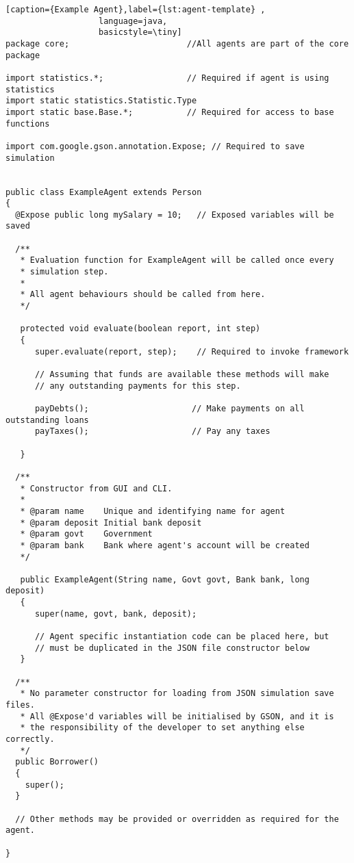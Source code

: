 \begin{lstlisting}[caption={Example Agent},label={lst:agent-template} ,
                   language=java,
                   basicstyle=\tiny]
package core;                        //All agents are part of the core package

import statistics.*;                 // Required if agent is using statistics
import static statistics.Statistic.Type
import static base.Base.*;           // Required for access to base functions

import com.google.gson.annotation.Expose; // Required to save simulation


public class ExampleAgent extends Person
{
  @Expose public long mySalary = 10;   // Exposed variables will be saved

  /**
   * Evaluation function for ExampleAgent will be called once every
   * simulation step. 
   *
   * All agent behaviours should be called from here.
   */

   protected void evaluate(boolean report, int step)
   {
      super.evaluate(report, step);    // Required to invoke framework

      // Assuming that funds are available these methods will make
      // any outstanding payments for this step.

      payDebts();                     // Make payments on all outstanding loans
      payTaxes();                     // Pay any taxes

   }

  /**
   * Constructor from GUI and CLI.
   *
   * @param name    Unique and identifying name for agent
   * @param deposit Initial bank deposit
   * @param govt    Government
   * @param bank    Bank where agent's account will be created
   */

   public ExampleAgent(String name, Govt govt, Bank bank, long deposit)
   {
      super(name, govt, bank, deposit);

      // Agent specific instantiation code can be placed here, but
      // must be duplicated in the JSON file constructor below
   }

  /**
   * No parameter constructor for loading from JSON simulation save files. 
   * All @Expose'd variables will be initialised by GSON, and it is 
   * the responsibility of the developer to set anything else correctly.
   */
  public Borrower()
  {
    super();
  }

  // Other methods may be provided or overridden as required for the agent.

}
\end{lstlisting}

